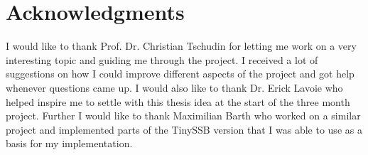 \chapter{Acknowledgments}
I would like to thank Prof. Dr. Christian Tschudin for letting me work on a very interesting topic and guiding me through the project. I received a lot of suggestions on how I could improve different aspects of the project and got help whenever questions came up. I would also like to thank Dr. Erick Lavoie who helped inspire me to settle with this thesis idea at the start of the three month project. Further I would like to thank Maximilian Barth who worked on a similar project and implemented parts of the TinySSB version that I was able to use as a basis for my implementation.